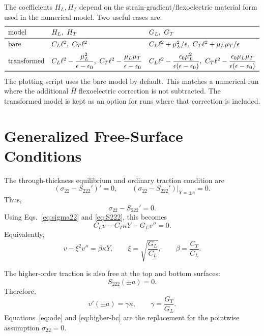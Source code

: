 \documentclass[11pt]{article}
\begin{document}
The coefficients \(H_L,H_T\) depend on the strain-gradient/flexoelectric material
form used in the numerical model.  Two useful cases are:
\[
\begin{array}{lll}
\toprule
\text{model} & H_L,\ H_T & G_L,\ G_T \\
\midrule
\text{bare} &
C_L\ell^2,\ C_T\ell^2 &
C_L\ell^2+\mu_L^2/\epsilon,\ C_T\ell^2+\mu_L\mu_T/\epsilon
\\[2mm]
\text{transformed} &
C_L\ell^2-\dfrac{\mu_L^2}{\epsilon-\epsilon_0},\
C_T\ell^2-\dfrac{\mu_L\mu_T}{\epsilon-\epsilon_0}
&
C_L\ell^2-\dfrac{\epsilon_0\mu_L^2}{\epsilon(\epsilon-\epsilon_0)},\
C_T\ell^2-\dfrac{\epsilon_0\mu_L\mu_T}{\epsilon(\epsilon-\epsilon_0)}
\\
\bottomrule
\end{array}
\]
The plotting script uses the bare model by default.  This matches a numerical run
where the additional \(\bar H\) flexoelectric correction is not subtracted.  The
transformed model is kept as an option for runs where that correction is included.

\section{Generalized Free-Surface Conditions}

The through-thickness equilibrium and ordinary traction condition are
\[
  \left(\sigma_{22}-S_{222}'\right)'=0,
  \qquad
  \left.\left(\sigma_{22}-S_{222}'\right)\right|_{Y=\pm a}=0 .
\]
Thus,
\begin{equation}
  \sigma_{22}-S_{222}'=0 .
  \label{eq:generalized-traction}
\end{equation}
Using Eqs.~\eqref{eq:sigma22} and \eqref{eq:S222}, this becomes
\begin{equation}
  C_L v-C_T\kappa Y-G_L v''=0 .
\end{equation}
Equivalently,
\begin{equation}
  v-\xi^2 v''=\beta\kappa Y,
  \qquad
  \xi=\sqrt{\frac{G_L}{C_L}},
  \qquad
  \beta=\frac{C_T}{C_L}.
  \label{eq:ode}
\end{equation}

The higher-order traction is also free at the top and bottom surfaces:
\[
  S_{222}(\pm a)=0.
\]
Therefore,
\begin{equation}
  v'(\pm a)=\gamma\kappa,
  \qquad
  \gamma=\frac{G_T}{G_L}.
  \label{eq:higher-bc}
\end{equation}
Equations~\eqref{eq:ode} and \eqref{eq:higher-bc} are the replacement for the
pointwise assumption \(\sigma_{22}=0\).
\end{document}

